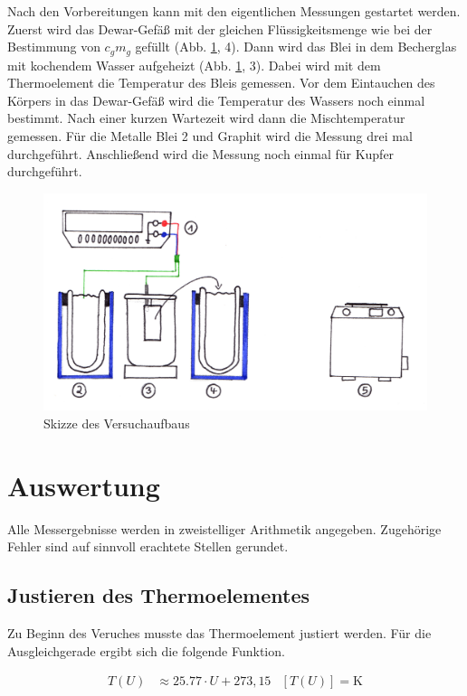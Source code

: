 Nach den Vorbereitungen kann mit den eigentlichen Messungen gestartet werden.
Zuerst wird das Dewar-Gefäß mit der gleichen Flüssigkeitsmenge wie bei der
Bestimmung von $c_g m_g$ gefüllt (Abb. \ref{fig:Skizze}, 4). Dann wird das Blei in dem Becherglas mit kochendem
Wasser aufgeheizt (Abb. \ref{fig:Skizze}, 3). Dabei wird mit dem Thermoelement die Temperatur des Bleis
gemessen. Vor dem Eintauchen des Körpers in das Dewar-Gefäß wird die
Temperatur des Wassers noch einmal bestimmt. Nach einer kurzen Wartezeit wird
dann die Mischtemperatur gemessen.
Für die Metalle Blei 2 und Graphit wird die Messung drei mal durchgeführt.
Anschließend wird die Messung noch einmal für Kupfer durchgeführt.

\begin{figure}
  \includegraphics{VersuchsSkizze.jpg}
  \caption{Skizze des Versuchaufbaus}
  \label{fig:Skizze}
\end{figure}

\newpage

\section{Auswertung}

Alle Messergebnisse werden in zweistelliger Arithmetik angegeben. Zugehörige
Fehler sind auf sinnvoll erachtete Stellen gerundet.

\subsection{Justieren des Thermoelementes}
Zu Beginn des Veruches musste das Thermoelement justiert werden. Für die
Ausgleichgerade ergibt sich die folgende Funktion.

\begin{align*}
  T(U) &\approx 25.77 \cdot U + 273,15 & [T(U)] = \si{\kelvin}
\end{align*}

